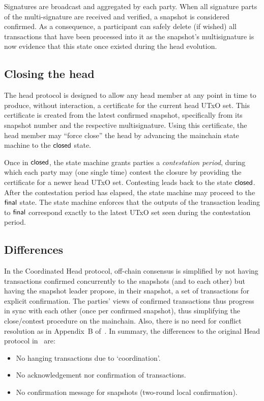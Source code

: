 Signatures are broadcast and aggregated by each party. When all signature parts
of the multi-signature are received and verified, a snapshot is considered
confirmed. As a consequence, a participant can safely delete (if wished) all
transactions that have been processed into it as the snapshot's multisignature
is now evidence that this state once existed during the head evolution.

\subsection{Closing the head}

The head protocol is designed to allow any head member at any point in time to
produce, without interaction, a certificate for the current head UTxO set. This
certificate is created from the latest confirmed snapshot, specifically from its
snapshot number and the respective multisignature. Using this certificate, the
head member may ``force close'' the head by advancing the mainchain state
machine to the $\mathsf{closed}$ state.

Once in $\mathsf{closed}$, the state machine grants parties a \emph{contestation
  period}, during which each party may (one single time) contest the closure by
providing the certificate for a newer head UTxO set. Contesting leads back to
the state $\mathsf{closed}$. After the contestation period has elapsed, the state
machine may proceed to the $\mathsf{final}$ state. The state machine enforces that the
outputs of the transaction leading to $\mathsf{final}$ correspond exactly to the
latest UTxO set seen during the contestation period.

\subsection{Differences}

In the Coordinated Head protocol, off-chain consensus is simplified by not
having transactions confirmed concurrently to the snapshots (and to each other)
but having the snapshot leader propose, in their snapshot, a set of transactions
for explicit confirmation. The parties' views of confirmed transactions thus
progress in sync with each other (once per confirmed snapshot), thus simplifying
the close/contest procedure on the mainchain. Also, there is no need for
conflict resolution as in Appendix~B of~\cite{hydrahead20}. In summary, the
differences to the original Head protocol in~\cite{hydrahead20} are:

\begin{itemize}
  \item No hanging transactions due to `coordination'.
  \item No acknowledgement nor confirmation of transactions.
  \item No confirmation message for snapshots (two-round local confirmation).
\end{itemize}

